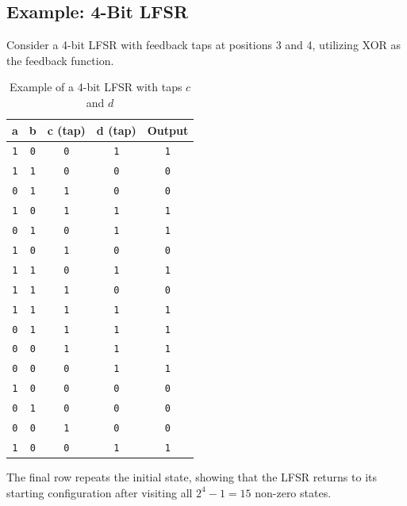 \subsection{Example: 4-Bit LFSR}

Consider a 4-bit LFSR with feedback taps at positions 3 and 4, utilizing XOR as the feedback function.

\begin{table}[h]
\centering
\begin{tabular}{c c c c c}
\toprule
\textbf{a} & \textbf{b} & \textbf{c (tap)} & \textbf{d (tap)} & \textbf{Output} \\
\midrule
\texttt{1} & \texttt{0} & \texttt{0} & \texttt{1} & \texttt{1} \\
\texttt{1} & \texttt{1} & \texttt{0} & \texttt{0} & \texttt{0} \\
\texttt{0} & \texttt{1} & \texttt{1} & \texttt{0} & \texttt{0} \\
\texttt{1} & \texttt{0} & \texttt{1} & \texttt{1} & \texttt{1} \\
\texttt{0} & \texttt{1} & \texttt{0} & \texttt{1} & \texttt{1} \\
\texttt{1} & \texttt{0} & \texttt{1} & \texttt{0} & \texttt{0} \\
\texttt{1} & \texttt{1} & \texttt{0} & \texttt{1} & \texttt{1} \\
\texttt{1} & \texttt{1} & \texttt{1} & \texttt{0} & \texttt{0} \\
\texttt{1} & \texttt{1} & \texttt{1} & \texttt{1} & \texttt{1} \\
\texttt{0} & \texttt{1} & \texttt{1} & \texttt{1} & \texttt{1} \\
\texttt{0} & \texttt{0} & \texttt{1} & \texttt{1} & \texttt{1} \\
\texttt{0} & \texttt{0} & \texttt{0} & \texttt{1} & \texttt{1} \\
\texttt{1} & \texttt{0} & \texttt{0} & \texttt{0} & \texttt{0} \\
\texttt{0} & \texttt{1} & \texttt{0} & \texttt{0} & \texttt{0} \\
\texttt{0} & \texttt{0} & \texttt{1} & \texttt{0} & \texttt{0} \\
\texttt{1} & \texttt{0} & \texttt{0} & \texttt{1} & \texttt{1} \\
\bottomrule
\end{tabular}
\caption{Example of a 4-bit LFSR with taps $c$ and $d$}
\end{table}

The final row repeats the initial state, showing that the LFSR returns to its starting configuration after visiting all $2^4-1=15$ non-zero states.


